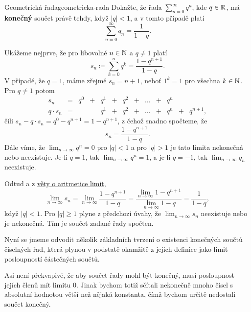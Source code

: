 \begin{problem}{Geometrická řada}{geometricka-rada}
 Dokažte, že řada $\sum_{n=0}^{\infty} q^{n}$, kde $q \in \mathbb{R}$, má
 \textbf{konečný} součet právě tehdy, když $|q| < 1$, a v tomto případě platí
 \[
  \sum_{n=0}^{\infty} q_n = \frac{1}{1-q}.
 \]
\end{problem}
\begin{probsol}
 Ukážeme nejprve, že pro libovolné $n \in \mathbb{N}$ a $q \neq 1$ platí
 \[
  s_n \coloneqq \sum_{k=0}^n q^{k} = \frac{1 - q^{n+1}}{1 - q}.
 \]
 V případě, že $q = 1$, máme zřejmě $s_n = n + 1$, neboť $1^{k} = 1$ pro všechna
 $k \in \mathbb{N}$. Pro $q \neq 1$ potom
 \begin{equation*}
  \begin{array}{ccccccccccccc}
   s_n & = & q^{0} & + & q^{1} & + & q^{2} & + & \ldots & + & q^{n} & &\\
   q \cdot s_n & = & & & q^{1} & + & q^2 & + & \ldots & + & q^{n} & + & q^{n+1},
  \end{array}
 \end{equation*}
 čili $s_n - q \cdot s_n = q^{0} - q^{n+1} = 1 - q^{n+1}$, z čehož snadno
 spočteme, že
 \[
  s_n = \frac{1-q^{n+1}}{1 - q}.
 \]
 Dále víme, že $\lim_{n \to \infty} q^{n} = 0$ pro $|q| < 1$ a pro $|q| > 1$ je
 tato limita nekonečná nebo neexistuje. Je-li $q = 1$, tak $\lim_{n \to \infty}
 q^{n} = 1$, a je-li $q = -1$, tak $\lim_{n \to \infty} q_n$ neexistuje.

 Odtud a z \hyperref[thm:aritmetika-limit]{věty o aritmetice limit},
 \[
  \lim_{n \to \infty} s_n = \lim_{n \to \infty} \frac{1-q^{n+1}}{1-q} =
  \frac{\lim_{n \to \infty} 1-q^{n+1}}{\lim_{n \to \infty} 1-q} = \frac{1}{1-q},
 \]
 když $|q| < 1$. Pro $|q| \geq 1$ plyne z předchozí úvahy, že $\lim_{n \to
 \infty} s_n$ neexistuje nebo je nekonečná. Tím je součet zadané řady spočten.
\end{probsol}

Nyní se jmeme odvodit několik základních tvrzení o existenci konečných součtů
číselných řad, která plynou v podstatě okamžitě z jejich definice jako limit
posloupností částečných součtů.

Asi není překvapivé, že aby součet řady mohl být konečný, musí posloupnost
jejích členů mít limitu $0$. Jinak bychom totiž sčítali nekonečně mnoho čísel s
absolutní hodnotou větší než nějaká konstanta, čímž bychom určitě nedostali
součet konečný.

